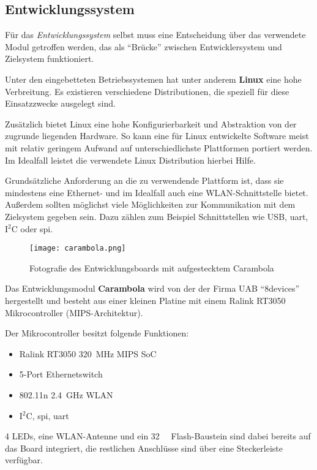 \subsection{Entwicklungssystem}
Für das \emph{Entwicklungssystem} selbst muss eine Entscheidung über das
verwendete Modul getroffen werden, das als "`Brücke"' zwischen Entwicklersystem
und Zielsystem funktioniert.

Unter den eingebetteten Betriebssystemen hat unter anderem \textbf{Linux} eine
hohe Verbreitung. Es existieren verschiedene Distributionen, die speziell für
diese Einsatzzwecke ausgelegt sind.

Zusätzlich bietet Linux eine hohe Konfigurierbarkeit und Abstraktion von der
zugrunde liegenden Hardware. So kann eine für Linux entwickelte Software meist
mit relativ geringem Aufwand auf unterschiedlichste Plattformen portiert werden.
Im Idealfall leistet die verwendete Linux Distribution hierbei Hilfe.

Grundsätzliche Anforderung an die zu verwendende Plattform ist, dass sie
mindestens eine Ethernet- und im Idealfall auch eine WLAN-Schnittstelle bietet.
Außerdem sollten möglichst viele Möglichkeiten zur Kommunikation mit dem
Zielsystem gegeben sein. Dazu zählen zum Beispiel Schnittstellen wie USB,
\gls{uart}, I$^2$C oder \gls{spi}.\clearpage

\begin{figure}[!ht]
\centering
\texttt{[image: carambola.png]}\\
\caption{Fotografie des Entwicklungsboards mit aufgestecktem Carambola}{}
\end{figure}

Das Entwicklungsmodul \textbf{Carambola}\cite{CARAM1} wird von der der Firma UAB
"`8devices"' hergestellt und besteht aus einer kleinen Platine mit einem Ralink
RT3050\cite{RA01} Mikrocontroller (MIPS-Architektur).

Der Mikrocontroller besitzt folgende Funktionen: 
\begin{itemize}
  \item Ralink RT3050 \SI{320}{\mega\hertz} MIPS SoC
  \item 5-Port Ethernetswitch
  \item 802.11n \SI{2,4}{\giga\hertz} WLAN
  \item I$^2$C, \gls{spi}, \gls{uart}
\end{itemize}
4 LEDs, eine WLAN-Antenne und ein \SI{32}{\mega\byte} Flash-Baustein sind dabei
bereits auf das Board integriert, die restlichen Anschlüsse sind über eine
Steckerleiste verfügbar.

